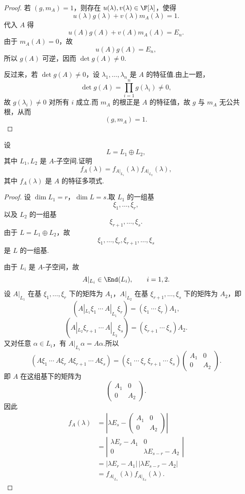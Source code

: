 \begin{proof}
	若 $(g,m_A)=1$，则存在 $u(\lambda),v(\lambda)\in\F[\lambda]$，使得
	\[
	u(\lambda)g(\lambda)+v(\lambda)m_A(\lambda)=1.
	\]
	代入 $A$ 得
	\[
	u(A)g(A)+v(A)m_A(A)=E_n.
	\]
	由于 $m_A(A)=0$，故
	\[
	u(A)g(A)=E_n,
	\]
	所以 $g(A)$ 可逆，因而 $\det g(A)\neq0$.
	
	反过来，若 $\det g(A)\neq0$，设 $\lambda_1,\ldots,\lambda_n$ 是 $A$ 的特征值.由上一题，
	\[
	\det g(A)=\prod_{i=1}^n g(\lambda_i)\neq0,
	\]
	故 $g(\lambda_i)\neq0$ 对所有 $i$ 成立.而 $m_A$ 的根正是 $A$ 的特征值，故 $g$ 与 $m_A$ 无公共根，从而
	\[
	(g,m_A)=1.
	\]
\end{proof}

\begin{problem}[59]
	设
	\[
	L=L_1\oplus L_2,
	\]
	其中 $L_1,L_2$ 是 $A$-子空间.证明
	\[
	f_A(\lambda)=f_{A|_{L_1}}(\lambda)f_{A|_{L_2}}(\lambda),
	\]
	其中 $f_A(\lambda)$ 是 $A$ 的特征多项式.
\end{problem}

\begin{proof}
	设 $\dim L_1=r$，$\dim L=s$.取 $L_1$ 的一组基
	\[
	\xi_1,\ldots,\xi_r,
	\]
	以及 $L_2$ 的一组基
	\[
	\xi_{r+1},\ldots,\xi_s.
	\]
	由于 $L=L_1\oplus L_2$，故
	\[
	\xi_1,\ldots,\xi_r,\xi_{r+1},\ldots,\xi_s
	\]
	是 $L$ 的一组基.
	
	由于 $L_i$ 是 $A$-子空间，故
	\[
	A|_{L_i}\in\End(L_i),\qquad i=1,2.
	\]
	设 $A|_{L_1}$ 在基 $\xi_1,\ldots,\xi_r$ 下的矩阵为 $A_1$，$A|_{L_2}$ 在基 $\xi_{r+1},\ldots,\xi_s$ 下的矩阵为 $A_2$，即
	\[
	(A|_{L_1}\xi_1\ \cdots\ A|_{L_1}\xi_r)=(\xi_1\ \cdots\ \xi_r)A_1,
	\]
	\[
	(A|_{L_2}\xi_{r+1}\ \cdots\ A|_{L_2}\xi_s)=(\xi_{r+1}\ \cdots\ \xi_s)A_2.
	\]
	又对任意 $\alpha\in L_i$，有 $A|_{L_i}\alpha=A\alpha$.所以
	\[
	(A\xi_1\ \cdots\ A\xi_r\ A\xi_{r+1}\ \cdots\ A\xi_s)
	=(\xi_1\ \cdots\ \xi_r\ \xi_{r+1}\ \cdots\ \xi_s)
	\begin{pmatrix}
		A_1&0\\
		0&A_2
	\end{pmatrix}.
	\]
	即 $A$ 在这组基下的矩阵为
	\[
	\begin{pmatrix}
		A_1&0\\
		0&A_2
	\end{pmatrix}.
	\]
	因此
	\[
	\begin{aligned}
		f_A(\lambda)
		&=\left|\lambda E_s-
		\begin{pmatrix}
			A_1&0\\
			0&A_2
		\end{pmatrix}\right|\\
		&=\left|\begin{matrix}
			\lambda E_r-A_1&0\\
			0&\lambda E_{s-r}-A_2
		\end{matrix}\right|\\
		&=|\lambda E_r-A_1|\,|\lambda E_{s-r}-A_2|\\
		&=f_{A|_{L_1}}(\lambda)f_{A|_{L_2}}(\lambda).
	\end{aligned}
	\]
\end{proof}



